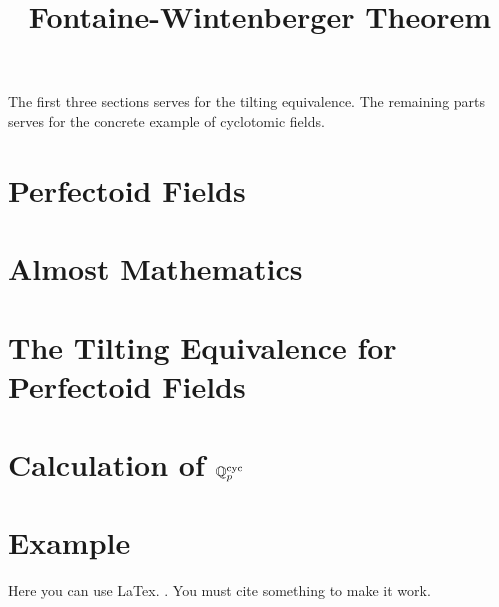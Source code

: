 \title{Fontaine-Wintenberger Theorem}




\maketitle


\tableofcontents

The first three sections serves for the tilting equivalence. The remaining parts serves for the concrete example of cyclotomic fields.

\section{Perfectoid Fields}

\begin{definition}
    \label{Perfectoid Definition}
\end{definition}

\section{Almost Mathematics}

\section{The Tilting Equivalence for Perfectoid Fields}

\section{Calculation of $\mathbb{Q}_p^{{\text{cyc}}}$}


\section{Example}
Here you can use LaTex. \cite{marcus}. You must cite something to make it work.


